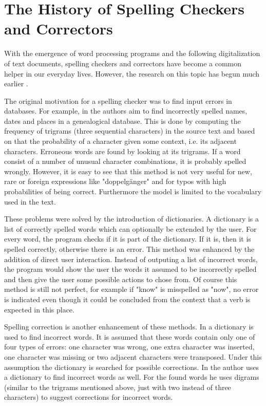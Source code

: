 \section{The History of Spelling Checkers and Correctors}

With the emergence of word processing programs and the following digitalization of text documents, spelling checkers and correctors have become a common helper in our everyday lives. However, the research on this topic has begun much earlier \cite{program_check_correction}.

The original motivation for a spelling checker was to find input errors in databases. For example, in \cite{data_correction} the authors aim to find incorrectly spelled names, dates and places in a genealogical database. This is done by computing the frequency of trigrams (three sequential characters) in the source text and based on that the probability of a character given some context, i.e. its adjacent characters. Erroneous words are found by looking at its trigrams. If a word consist of a number of unusual character combinations, it is probably spelled wrongly. However, it is easy to see that this method is not very useful for new, rare or foreign expressions like "doppelg\"{a}nger" and for typos with high probabilities of being correct. Furthermore the model is limited to the vocabulary used in the text.

These problems were solved by the introduction of dictionaries. A dictionary is a list of correctly spelled words which can optionally be extended by the user. For every word, the program checks if it is part of the dictionary. If it is, then it is spelled correctly, otherwise there is an error. This method was enhanced by the addition of direct user interaction. Instead of outputing a list of incorrect words, the program would show the user the words it assumed to be incorrectly spelled and then give the user some possible actions to chose from. Of course this method is still not perfect, for example if "know" is misspelled as "now", no error is indicated even though it could be concluded from the context that a verb is expected in this place.

Spelling correction is another enhancement of these methods. In \cite{dictionary_correction} a dictionary is used to find incorrect words. It is assumed that these words contain only one of four types of errors: one character was wrong, one extra character was inserted, one character was missing or two adjacent characters were transposed. Under this assumption the dictionary is searched for possible corrections. In \cite{digram_correction} the author uses a dictionary to find incorrect words as well. For the found words he uses digrams (similar to the trigrams mentioned above, just with two instead of three characters) to suggest corrections for incorrect words.

